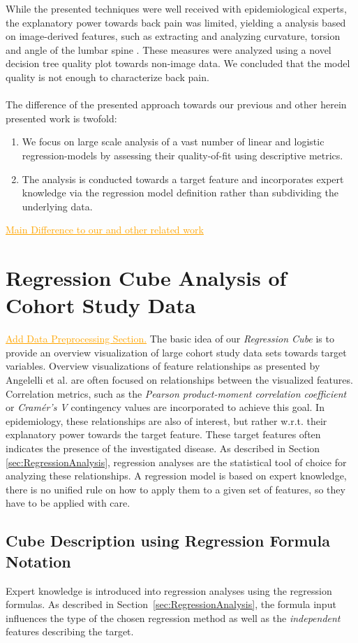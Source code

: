 \documentclass[journal]{style/vgtc} 			          %
\newcommand{\com}[1]{\textcolor{orange}{\uline{#1}}}
\begin{document}
While the presented techniques were well received with epidemiological experts, the explanatory power towards back pain was limited, yielding a analysis based on image-derived features, such as extracting and analyzing curvature, torsion and angle of the lumbar spine \cite{Klemm2015}.
These measures were analyzed using a novel decision tree quality plot towards non-image data.
We concluded that the model quality is not enough to characterize back pain.
\\\\
The difference of the presented approach towards our previous and other herein presented work is twofold:
\begin{enumerate}
	\item We focus on large scale analysis of a vast number of linear and logistic regression-models by assessing their quality-of-fit using descriptive metrics.
	\item The analysis is conducted towards a target feature and incorporates expert knowledge via the regression model definition rather than subdividing the underlying data.
\end{enumerate}
\com{Main Difference to our and other related work}
\section{Regression Cube Analysis of Cohort Study Data}
\com{Add Data Preprocessing Section.}
The basic idea of our \emph{Regression Cube} is to provide an overview visualization of large cohort study data sets towards target variables.
Overview visualizations of feature relationships as presented by Angelelli et al. \cite{Angelelli} are often focused on relationships between the visualized features.
Correlation metrics, such as the \emph{Pearson product-moment correlation coefficient} or \emph{Cram\'{e}r's V} contingency values are incorporated to achieve this goal.
In epidemiology, these relationships are also of interest, but rather w.r.t. their explanatory power towards the target feature.
These target features often indicates the presence of the investigated disease.
As described in Section \ref{sec:RegressionAnalysis}, regression analyses are the statistical tool of choice for analyzing these relationships.
A regression model is based on expert knowledge, there is no unified rule on how to apply them to a given set of features, so they have to be applied with care.
\subsection{Cube Description using Regression Formula Notation}
Expert knowledge is introduced into regression analyses using the regression formulas.
As described in Section~\ref{sec:RegressionAnalysis}, the formula input influences the type of the chosen regression method as well as the \emph{independent} features describing the target.
\end{document}
